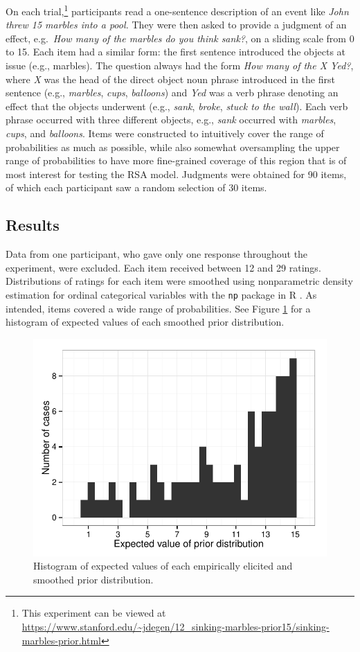 \documentclass[10pt,letterpaper]{article}
\newcommand{\red}[1]{\textcolor{Red}{#1}}
\newcommand{\figref}[1]{Figure \ref{#1}}
\begin{document}
On each trial,\footnote{This experiment can be viewed at \url{https://www.stanford.edu/~jdegen/12_sinking-marbles-prior15/sinking-marbles-prior.html}} participants read a one-sentence description of an event like \emph{John threw 15 marbles into a pool.} They were then asked to provide a judgment of an effect, e.g.~\emph{How many of the marbles do you think sank?}, on a sliding scale from 0 to 15. Each item had a similar form: the first sentence introduced the objects at issue (e.g., marbles). The question always had the form \emph{How many of the X Yed?}, where \emph{X} was the head of the direct object noun phrase introduced in the first sentence (e.g., \emph{marbles}, \emph{cups}, \emph{balloons}) and \emph{Yed} was a verb phrase denoting an effect that the objects underwent (e.g., \emph{sank}, \emph{broke}, \emph{stuck to the wall}). Each verb phrase occurred with three different objects, e.g., \emph{sank} occurred with \emph{marbles}, \emph{cups}, and \emph{balloons}. Items were constructed to intuitively cover the range of probabilities as much as possible, while also somewhat oversampling the upper range of probabilities to have more fine-grained coverage of this region that is of most interest for testing the RSA model. Judgments were obtained for 90 items, of which each participant saw a random selection of 30 items. 

\subsection{Results}

Data from one participant, who gave only one response throughout the experiment, were excluded. Each item received between 12 and 29 ratings. Distributions of ratings for each item were smoothed using nonparametric density estimation for ordinal categorical variables \cite{liracine2003} with the \verb|np| package in R \cite{hayfield2008}. As intended, items covered a wide range of probabilities. See \figref{fig:probhist} for a histogram of expected values of each smoothed prior distribution.

\begin{figure}
	\includegraphics[width=.5\textwidth]{pics/priorexpectations-histogram}	
	\caption{Histogram of expected values of each empirically elicited and smoothed prior distribution.}
	\label{fig:probhist}	
\end{figure}
\end{document}
